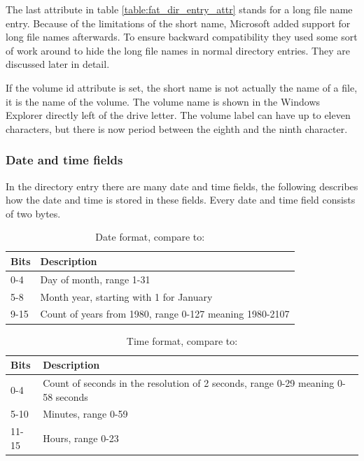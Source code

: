 The last attribute in table \ref{table:fat_dir_entry_attr} stands for a long file name entry. Because of the limitations of the short name, Microsoft added support for long file names afterwards. To ensure backward compatibility they used some sort of work around to hide the long file names in normal directory entries. They are discussed later in detail.

If the volume id attribute is set, the short name is not actually the name of a file, it is the name of the volume. The volume name is shown in the Windows Explorer directly left of the drive letter. The volume label can have up to eleven characters, but there is now period between the eighth and the ninth character.

\subsubsection{Date and time fields}

In the directory entry there are many date and time fields, the following describes how the date and time is stored in these fields. Every date and time field consists of two bytes. 

\begin{table}[!ht]
\caption{Date format, compare to: \cite{usb_ms_jan, fatgen103}}
\centering
\begin{tabular}{|l|p{9cm}|}
\hline\hline
\textbf{Bits} & \textbf{Description}\\ \hline
0-4 & Day of month, range 1-31 \\ \hline
5-8 & Month year, starting with 1 for January \\ \hline
9-15 & Count of years from 1980, range 0-127 meaning 1980-2107 \\ \hline
\end{tabular}
\label{table:fat_dir_entry_date}
\end{table}

\begin{table}[!ht]
\caption{Time format, compare to: \cite{usb_ms_jan, fatgen103}}
\centering
\begin{tabular}{|l|p{9cm}|}
\hline\hline
\textbf{Bits} & \textbf{Description} \\ \hline
0-4 & Count of seconds in the resolution of 2 seconds, range 0-29 meaning 0-58 seconds \\ \hline
5-10 & Minutes, range 0-59 \\ \hline
11-15 & Hours, range 0-23 \\ \hline
\end{tabular}
\label{table:fat_dir_entry_time}
\end{table}

